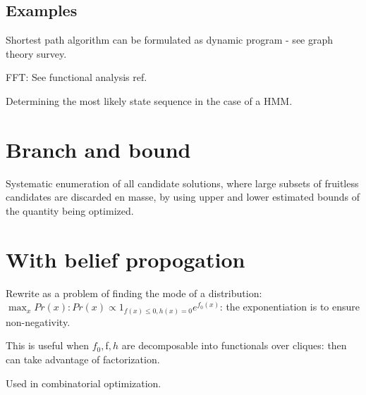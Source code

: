 \documentclass[oneside, article]{memoir}
\begin{document}
\section{Examples}
Shortest path algorithm can be formulated as dynamic program - see graph theory survey.

FFT: See functional analysis ref.

Determining the most likely state sequence in the case of a HMM.

\chapter{Branch and bound}
Systematic enumeration of all candidate solutions, where large subsets of fruitless candidates are discarded en masse, by using upper and lower estimated bounds of the quantity being optimized.

\chapter{With belief propogation}
Rewrite as a problem of finding the mode of a distribution: $\max_x Pr(x): Pr(x) \propto 1_{f(x) \leq 0, h(x) = 0} e^{f_0(x)}$: the exponentiation is to ensure non-negativity.

This is useful when $f_0, $f$, h$ are decomposable into functionals over cliques: then can take advantage of factorization.

Used in combinatorial optimization.

% 
% 
\end{document}
